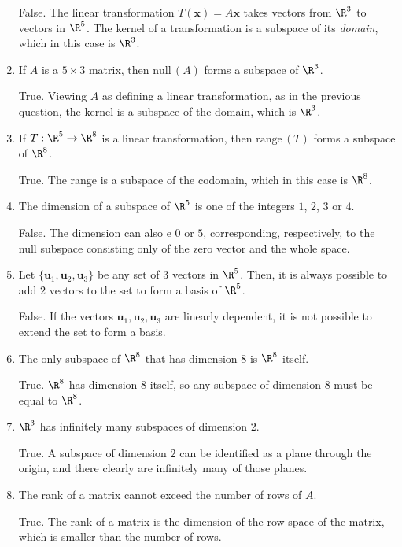 \documentclass[12pt]{article}
\begin{document}
\begin{enumerate}
False. The linear transformation $T(\mathbf{x})=A\mathbf{x}$ takes vectors from $\R^3$ to vectors in $\R^5$. The kernel of a transformation is a subspace of its \emph{domain}, which in this case is $\R^3$.

\item If $A$ is a $5\times 3$ matrix, then $\text{null}\,(A)$ forms a subspace of $\R^3$.

True. Viewing $A$ as defining a linear transformation, as in the previous question, the kernel is a subspace of the domain, which is $\R^3$.

\item If $T:\R^5\to\R^8$ is a linear transformation, then $\text{range}\,(T)$ forms a subspace of $\R^8$.

True. The range is a subspace of the codomain, which in this case is $\R^8$.

\item The dimension of a subspace of $\R^5$ is one of the integers $1$, $2$, $3$ or $4$.

False. The dimension can also e $0$ or $5$, corresponding, respectively, to the null subspace consisting only of the zero vector and the whole space.

\item Let $\{\mathbf{u}_1,\mathbf{u}_2,\mathbf{u}_3\}$ be any set of $3$ vectors in $\R^5$. Then, it is always possible to add $2$ vectors to the set to form a basis of $\R^5$.

False. If the vectors $\mathbf{u}_1,\mathbf{u}_2,\mathbf{u}_3$ are linearly dependent, it is not possible to extend the set to form a basis.

\item The only subspace of $\R^8$ that has dimension 8 is $\R^8$ itself.

True. $\R^8$ has dimension $8$ itself, so any subspace of dimension $8$ must be equal to $\R^8$.

\item $\R^3$ has infinitely many subspaces of dimension $2$.

True. A subspace of dimension $2$ can be identified as a plane through the origin, and there clearly are infinitely many of those planes.

\item The rank of a matrix cannot exceed the number of rows of $A$.

True. The rank of a matrix is the dimension of the row space of the matrix, which is smaller than the number of rows.


\end{enumerate}
\end{document}

